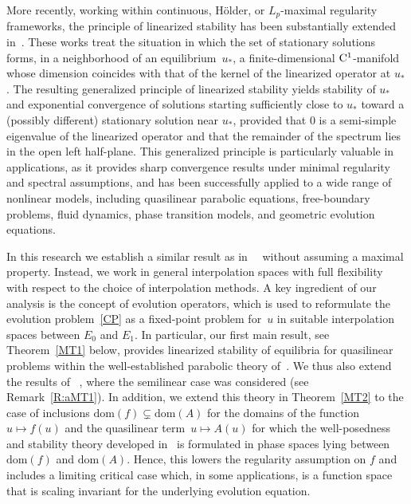 \documentclass[reqno,11pt]{amsart}
\numberwithin{equation}{section}
\theoremstyle{remark}
\begin{document}
More recently,  working within continuous, H\"older, or $L_p$-maximal regularity frameworks, the principle of linearized stability has been substantially  extended in~\cite{PS16, PSZ9a, PSZ09c}.
These works treat the situation in which the set of stationary solutions forms, in a neighborhood of an equilibrium~$u_*$, 
a finite-dimensional ${\rm C}^1$-manifold whose dimension coincides with that of the kernel of the linearized operator at $u_*$.
The resulting generalized principle of linearized stability yields  stability of $u_*$ and exponential convergence of solutions starting sufficiently close to $u_*$ 
toward a (possibly different) stationary solution near $u_*$, provided that $0$ is a semi-simple eigenvalue of the linearized operator and that the remainder of the spectrum lies in the open left half-plane.
This generalized principle is particularly valuable in applications, as it provides sharp convergence results under minimal regularity and spectral assumptions, 
and has been successfully applied to a wide range of nonlinear models, including quasilinear parabolic equations, free-boundary problems, fluid dynamics, phase transition models, and geometric evolution equations.

In this research we establish a similar result as in~~\cite{PS16, PSZ9a, PSZ09c}  without assuming a maximal property. 
Instead, we work in general interpolation spaces with full flexibility with respect to the choice of interpolation methods.
A key ingredient of our analysis is the concept of evolution operators, which is used to reformulate the evolution problem~\eqref{CP} as a fixed-point problem for~$u$ in suitable interpolation spaces between $E_0$ and $E_1$.
In particular, our first main result, see Theorem~\ref{MT1} below, provides linearized stability of equilibria for quasilinear problems within the well-established parabolic theory of~\cite{Am93}. We thus also extend the results of
~\cite{CDM25}, where the semilinear case was considered (see Remark~\ref{R:aMT1}).
In addition, we extend this theory  in Theorem~\ref{MT2} to the case of inclusions
$\mathrm{dom}(f)\subsetneq \mathrm{dom}(A)$ for the domains of the function~$u\mapsto f(u)$ and the quasilinear term~$u\mapsto A(u)$ for which the well-posedness and stability theory developed in~\cite{MRW25, MSW25} is formulated in phase spaces lying between $\mathrm{dom}(f)$ and $\mathrm{dom}(A)$. 
 Hence, this lowers the regularity assumption on $f$ and includes a limiting critical case which, in some applications, is a function space that is scaling invariant for the underlying evolution equation.  
 
\end{document}

